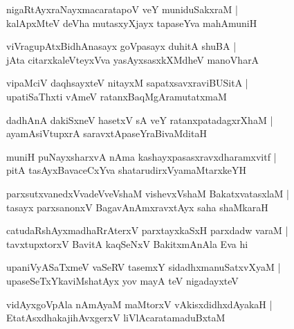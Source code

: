 \documentclass[twoside,12pt,openright]{book}
\newcounter{shloka}[chapter]
\begin{document}
\begin{shloka}%
nigaRtAyxraNayxmacaratapoV veY muniduSakxraM |\\
kalApxMteV deVha mutasxyXjayx tapaseYva mahAmuniH 
\end{shloka}

\begin{shloka}%
viVragupAtxBidhAnasayx goVpasayx duhitA shuBA |\\
jAta citarxkaleVteyxVva yasAyxsasxkXMdheV manoVharA 
\end{shloka}

\begin{shloka}%
vipaMciV daqhsayxteV nitayxM sapatxsavxraviBUSitA |\\
upatiSaThxti vAmeV ratanxBaqMgAramutatxmaM 
\end{shloka}

\begin{shloka}%
dadhAnA dakiSxneV hasetxV sA veY ratanxpatadagxrXhaM |\\
ayamAsiVtupxrA saravxtApaseYraBivaMditaH 
\end{shloka}

\begin{shloka}%
muniH puNayxsharxvA nAma kashayxpasasxravxdharamxvitf |\\
pitA tasAyxBavaceCxYva shatarudirxVyamaMtarxkeYH
\end{shloka}

\begin{shloka}%
parxsutxvanedxVvadeVveVshaM vishevxVshaM BakatxvatasxlaM |\\
tasayx parxsanonxV BagavAnAmxravxtAyx saha shaMkaraH 
\end{shloka}

\begin{shloka}%
catudaRshAyxmadhaRrAterxV parxtayxkaSxH parxdadw varaM |\\
tavxtupxtorxV BavitA kaqSeNxV BakitxmAnAla Eva hi 
\end{shloka}

\begin{shloka}%
upaniVyASaTxmeV vaSeRV tasemxY sidadhxmanuSatxvXyaM |\\
upaseSeTxYkaviMshatAyx yov mayA teV nigadayxteV 
\end{shloka}

\begin{shloka}%
vidAyxgoVpAla nAmAyaM maMtorxV vAkisxdidhxdAyakaH |\\
EtatAsxdhakajihAvxgerxV liVlAcaratamaduBxtaM 
\end{shloka}
\end{document}
